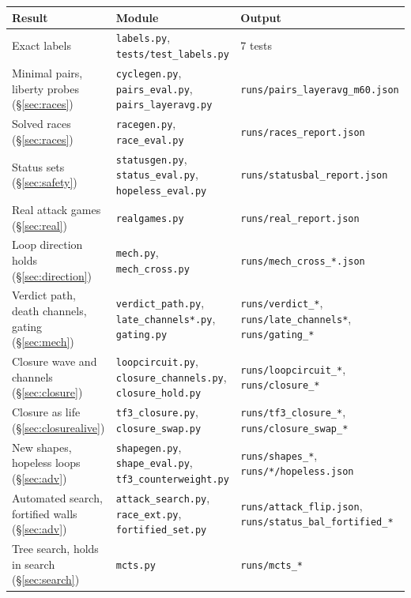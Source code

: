\documentclass[11pt]{article}
\begin{document}
\begin{table}[h]
\centering\scriptsize
\begin{tabular}{@{}L{4.2cm}L{5.6cm}L{5.6cm}@{}}
\toprule
Result & Module & Output \\
\midrule
Exact labels & \texttt{labels.py}, \texttt{tests/test\_labels.py} & 7 tests \\
Minimal pairs, liberty probes (\S\ref{sec:races}) & \texttt{cyclegen.py}, \texttt{pairs\_eval.py}, \texttt{pairs\_layeravg.py} & \texttt{runs/pairs\_layeravg\_m60.json} \\
Solved races (\S\ref{sec:races}) & \texttt{racegen.py}, \texttt{race\_eval.py} & \texttt{runs/races\_report.json} \\
Status sets (\S\ref{sec:safety}) & \texttt{statusgen.py}, \texttt{status\_eval.py}, \texttt{hopeless\_eval.py} & \texttt{runs/statusbal\_report.json} \\
Real attack games (\S\ref{sec:real}) & \texttt{realgames.py} & \texttt{runs/real\_report.json} \\
Loop direction holds (\S\ref{sec:direction}) & \texttt{mech.py}, \texttt{mech\_cross.py} & \texttt{runs/mech\_cross\_*.json} \\
Verdict path, death channels, gating (\S\ref{sec:mech}) & \texttt{verdict\_path.py}, \texttt{late\_channels*.py}, \texttt{gating.py} & \texttt{runs/verdict\_*}, \texttt{runs/late\_channels*}, \texttt{runs/gating\_*} \\
Closure wave and channels (\S\ref{sec:closure}) & \texttt{loopcircuit.py}, \texttt{closure\_channels.py}, \texttt{closure\_hold.py} & \texttt{runs/loopcircuit\_*}, \texttt{runs/closure\_*} \\
Closure as life (\S\ref{sec:closurealive}) & \texttt{tf3\_closure.py}, \texttt{closure\_swap.py} & \texttt{runs/tf3\_closure\_*}, \texttt{runs/closure\_swap\_*} \\
New shapes, hopeless loops (\S\ref{sec:adv}) & \texttt{shapegen.py}, \texttt{shape\_eval.py}, \texttt{tf3\_counterweight.py} & \texttt{runs/shapes\_*}, \texttt{runs/*/hopeless.json} \\
Automated search, fortified walls (\S\ref{sec:adv}) & \texttt{attack\_search.py}, \texttt{race\_ext.py}, \texttt{fortified\_set.py} & \texttt{runs/attack\_flip.json}, \texttt{runs/status\_bal\_fortified\_*} \\
Tree search, holds in search (\S\ref{sec:search}) & \texttt{mcts.py} & \texttt{runs/mcts\_*} \\
\bottomrule
\end{tabular}
\end{table}
\end{document}
